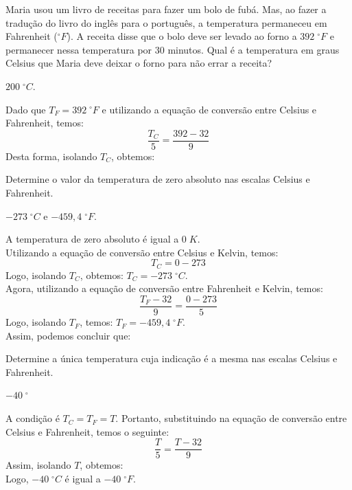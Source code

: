\begin{exercise}[ID=Q201001, difficulty=easy, type=ER, typequestion=open]
    Maria usou um livro de receitas para fazer um bolo de fubá. Mas, ao fazer a tradução do livro do inglês para o português, a temperatura permaneceu em Fahrenheit ($^\circ F$). A receita disse que o bolo deve ser levado ao forno a $392\;^\circ F$ e permanecer nessa temperatura por 30 minutos. Qual é a temperatura em graus Celsius que Maria deve deixar o forno para não errar a receita?
\end{exercise}
\begin{shortsolution}
	$200\;^\circ C$.
\end{shortsolution}
\begin{solution}
	Dado que $T_{F}=392\;^\circ F$ e utilizando a equação de conversão entre Celsius e Fahrenheit, temos: \[\dfrac{T_{C}}{5}=\dfrac{392-32}{9}\] Desta forma, isolando $T_{C}$, obtemos: 
\end{solution}

\begin{exercise}[ID=Q201002, difficulty=easy, type=ER, typequestion=open]
    Determine o valor da temperatura de zero absoluto nas escalas Celsius e Fahrenheit.
\end{exercise}
\begin{shortsolution}
	$-273\;^\circ C$ e $-459,4\;^\circ F$.
\end{shortsolution}
\begin{solution}
	A temperatura de zero absoluto é igual a $0\;K$.\\Utilizando a equação de conversão entre Celsius e Kelvin, temos: \[T_{C}=0-273\] Logo, isolando $T_{C}$, obtemos: $T_{C}=-273\;^\circ C$.\\ Agora, utilizando a equação de conversão entre Fahrenheit e Kelvin, temos: \[\dfrac{T_{F}-32}{9}=\dfrac{0-273}{5}\] Logo, isolando $T_{F}$, temos: $T_{F}=-459,4\;^\circ F$.\\ Assim, podemos concluir que:     
\end{solution}

\begin{exercise}[ID=Q201003, difficulty=easy, type=ER, typequestion=open]
    Determine a única temperatura cuja indicação é a mesma nas escalas Celsius e Fahrenheit.
\end{exercise}
\begin{shortsolution}
$-40\;^\circ$
\end{shortsolution}
\begin{solution}
	A condição é $T_{C}=T_{F}=T$. Portanto, substituindo na equação de conversão entre Celsius e Fahrenheit, temos o seguinte: \[\dfrac{T}{5}=\dfrac{T-32}{9}\] Assim, isolando $T$, obtemos: \\
	Logo, $-40\;^\circ C$ é igual a $-40\;^\circ F$.    
\end{solution}

